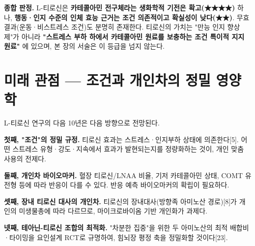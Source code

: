 \documentclass[11pt,oneside]{book}
\begin{document}
\vspace{2pt}\vspace{3pt}

\textbf{종합 판정.} L-티로신은 \textbf{카테콜아민 전구체라는 생화학적 기전은 확고(★★★★)} 하나, \textbf{행동·인지 수준의 인체 효능 근거는 조건 의존적이고 확실성이 낮다(★★)}. 무효 결과(운동·비스트레스 조건)도 분명히 존재한다. 티로신의 가치는 "만능 인지 향상제"가 아니라 \textbf{"스트레스 부하 하에서 카테콜아민 원료를 보충하는 조건 특이적 지지 원료"} 에 있으며, 본 장의 서술은 이 등급을 넘지 않는다.

\section{미래 관점 — 조건과 개인차의 정밀 영양학}
L-티로신 연구의 다음 10년은 다음 방향으로 전망된다.

\textbf{첫째, "조건"의 정밀 규정.} 티로신 효과는 스트레스·인지부하 상태에 의존한다[5]. 어떤 스트레스 유형·강도·지속에서 효과가 발현되는지를 정량화하는 것이, 개인 맞춤 사용의 전제다.

\textbf{둘째, 개인차 바이오마커.} 혈장 티로신/LNAA 비율, 기저 카테콜아민 상태, COMT 유전형 등에 따라 반응이 다를 수 있다. 반응 예측 바이오마커의 확립이 필요하다.

\textbf{셋째, 장내 티로신 대사의 개인차.} 티로신의 장내대사(방향족 아미노산 경로)[8]가 개인의 미생물총에 따라 다르므로, 마이크로바이옴 기반 개인화가 과제다.

\textbf{넷째, 테아닌-티로신 조합의 최적화.} "차분한 집중"을 위한 두 아미노산의 최적 배합비·타이밍을 요인설계 RCT로 규명하여, 힘뇌장 평정 축을 정밀화할 것이다[23].
\end{document}
